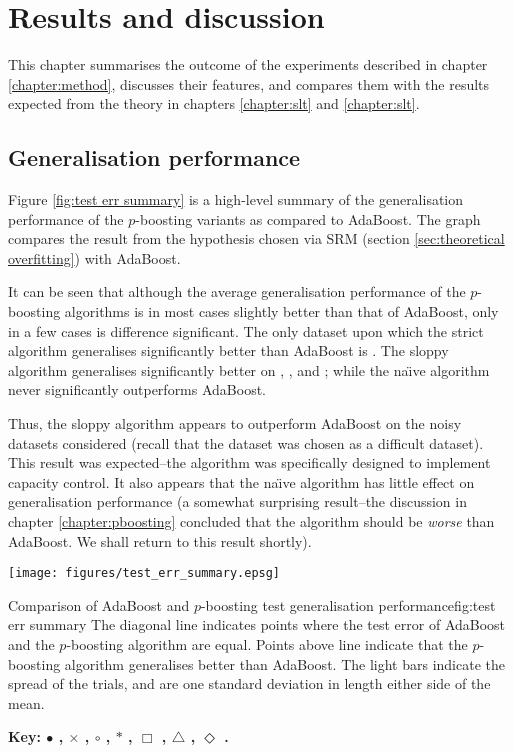 
\chapter{Results and discussion}
\label{chapter:results}

This chapter summarises the outcome of the experiments described in
chapter \ref{chapter:method}, discusses their features, and compares
them with the results expected from the theory in chapters
\ref{chapter:slt} and \ref{chapter:slt}.

\section{Generalisation performance}

Figure \ref{fig:test err summary} is a high-level summary of the
generalisation performance of the $p$-boosting variants as compared to
AdaBoost.  The graph compares the result from the hypothesis chosen
via SRM (section \ref{sec:theoretical overfitting}) with AdaBoost.

It can be seen that although the average generalisation performance of the
$p$-boosting algorithms is in most cases slightly better than that of
AdaBoost, only in a few cases is difference significant.  The only
dataset upon which the strict algorithm generalises significantly better
than AdaBoost is .  The sloppy algorithm generalises
significantly better on , ,  and
; while the na\"{\i}ve algorithm never significantly
outperforms AdaBoost.

Thus, the sloppy algorithm appears to outperform AdaBoost on the noisy
datasets considered (recall that the  dataset was chosen as
a difficult dataset).  This result was expected--the algorithm was
specifically designed to implement capacity control.  It also appears
that the na\"{\i}ve algorithm has little effect on generalisation
performance (a somewhat surprising result--the discussion in chapter
\ref{chapter:pboosting} concluded that the algorithm should be
\emph{worse} than AdaBoost.  We shall return to this result shortly).

\begin{linefigure}
\begin{center}
\texttt{[image: figures/test\_err\_summary.epsg]}
\end{center}
\begin{capt}{Comparison of AdaBoost and $p$-boosting test generalisation
performance}{fig:test err summary}
The diagonal line indicates points where the test error of AdaBoost
and the $p$-boosting algorithm are equal.  Points above line indicate
that the $p$-boosting algorithm generalises better than AdaBoost.  The
light bars indicate the spread of the trials, and are one standard
deviation in length either side of the mean.

\noindent\bf{Key:} $\bullet$ , $\times$ , $\circ$
, $\ast$ , $\Box$ , $\bigtriangleup$
, $\Diamond$ .
\end{capt}
\end{linefigure}


